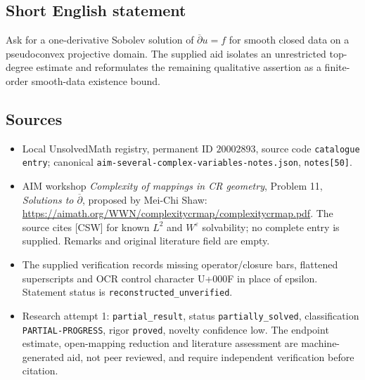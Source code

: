 \documentclass[11pt]{article}
\newcommand{\eps}{\varepsilon}
\begin{document}
\subsection{Short English statement}
Ask for a one-derivative Sobolev solution of $\overline\partial u=f$ for smooth closed data on a pseudoconvex projective domain. The supplied aid isolates an unrestricted top-degree estimate and reformulates the remaining qualitative assertion as a finite-order smooth-data existence bound.
\subsection{Sources}
\begin{itemize}
\item Local UnsolvedMath registry, permanent ID $20002893$, source code \texttt{catalogue entry}; canonical \texttt{aim-several-complex-variables-notes.json}, \texttt{notes[50]}.
\item AIM workshop \emph{Complexity of mappings in CR geometry}, Problem 11, \emph{Solutions to $\overline\partial$}, proposed by Mei-Chi Shaw: \url{https://aimath.org/WWN/complexitycrmap/complexitycrmap.pdf}. The source cites [CSW] for known $L^2$ and $W^\eps$ solvability; no complete entry is supplied. Remarks and original literature field are empty.
\item The supplied verification records missing operator/closure bars, flattened superscripts and OCR control character U+000F in place of epsilon. Statement status is \texttt{reconstructed\_unverified}.
\item Research attempt 1: \texttt{partial\_result}, status \texttt{partially\_solved}, classification \texttt{PARTIAL-PROGRESS}, rigor \texttt{proved}, novelty confidence low. The endpoint estimate, open-mapping reduction and literature assessment are machine-generated aid, not peer reviewed, and require independent verification before citation.
\end{itemize}
\end{document}
